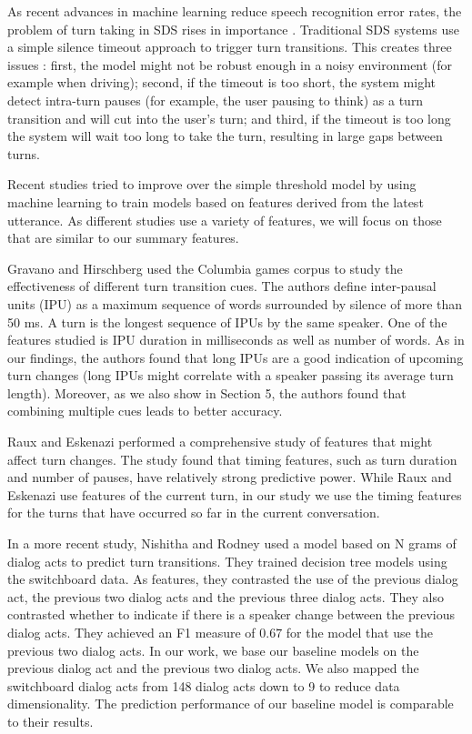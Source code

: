 
As recent advances in machine learning reduce speech recognition error rates, the problem of turn taking in SDS rises in importance \cite{hinton2012deep}. Traditional SDS systems use a simple silence timeout approach to trigger turn transitions. This creates three issues \cite{arsikere2015enhanced}: first, the model might not be robust enough
in a noisy environment (for example when driving); second, if the timeout is too short, the system might
detect intra-turn pauses (for example, the user pausing to think) as a turn transition and will cut into the user's turn;
and third, if the timeout is too long the system will wait too long to take the turn, resulting in large gaps between turns.

Recent studies tried to improve over the simple threshold model by using machine learning to train models based on features derived from the latest utterance. As different studies use a variety of features, we will focus on those that are similar to our summary features.

Gravano and Hirschberg \cite{gravano2011turn} used the Columbia games corpus to study the effectiveness of
different turn transition cues. The authors define inter-pausal units (IPU) as a maximum sequence of words surrounded by silence of more than 50 ms. A turn is the longest sequence of IPUs by the same speaker.
One of the features studied is IPU duration in milliseconds as well as number of words. As in our findings,
the authors found that long IPUs are a good indication of upcoming turn changes (long IPUs might correlate with a speaker passing its average turn length). Moreover, as we also show in Section 5, the authors found that combining multiple cues leads to better accuracy.

Raux and Eskenazi \cite{raux2012optimizing} performed a comprehensive study of features that might affect turn changes. The study
found that timing features, such as turn duration and number of pauses, have relatively strong predictive power. While Raux and Eskenazi use features of the current turn, in our study we use the timing features for the turns that have occurred so far in the current conversation.

In a more recent study, Nishitha and Rodney \cite{SSS1510313} used a model based on N grams of dialog acts to predict turn transitions.
They trained decision tree models using the switchboard data. As features, they contrasted the use of the previous dialog act, the previous two dialog acts and the previous three dialog acts. They also contrasted whether to indicate if there is a speaker change between the previous dialog acts. They achieved an F1 measure of $0.67$ for the model that use the previous two dialog acts.
%
In our work, we base our baseline models on the previous dialog act and the previous two dialog acts. We also mapped the switchboard dialog acts from 148 dialog acts down to 9 to reduce data dimensionality. The prediction performance of our baseline model is comparable to their results.

